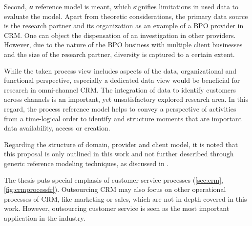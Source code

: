 Second, \textit{\textbf{a}} reference model is meant, which signifies limitations in used data to evaluate the model. Apart from theoretic considerations, the primary data source is the research partner and its organization as an example of a BPO provider in CRM. One can object the dispensation of an investigation in other providers. However, due to the nature of the BPO business with multiple client businesses and the size of the research partner, diversity is captured to a certain extent. 

While the taken process view includes aspects of the data, organizational and functional perspective, especially a dedicated data view would be beneficial for research in omni-channel \acrshort{CRM}. The integration of data to identify customers across channels is an important, yet unsatisfactory explored research area. In this regard, the process reference model helps to convey a perspective of activities from a time-logical order to identify and structure moments that are important \wrt data availability, access or creation. 

Regarding the structure of domain, provider and client model, it is noted that this proposal is only outlined in this work and not further described through generic reference modeling techniques, as discussed in \cite{delfmann2006adaptive, brocke2003referenzmodellierung}. 

The thesis puts special emphasis of customer service processes (\cf \ref{sec:crm}, \Fig \ref{fig:crmprocessfr}). Outsourcing \acrshort{CRM} may also focus on other operational processes of CRM, like marketing or sales, which are not in depth covered in this work. However, outsourcing customer service is seen as the most important application in the industry. 


